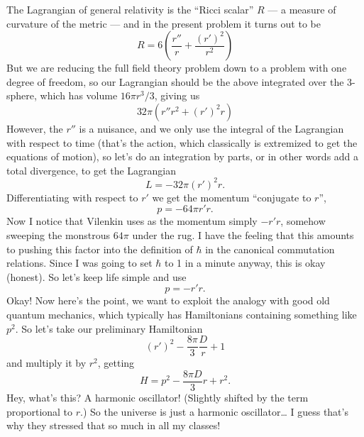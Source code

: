 \documentclass{article}
\begin{document}
The Lagrangian of general relativity is the ``Ricci scalar'' \(R\) --- a
measure of curvature of the metric --- and in the present problem it
turns out to be
\[R = 6 \left(\frac{r''}{r} + \frac{(r')^2}{r^2}\right)\] But we are
reducing the full field theory problem down to a problem with one degree
of freedom, so our Lagrangian should be the above integrated over the
3-sphere, which has volume \(16 \pi r^3/3\), giving us
\[32\pi (r''r^2 + (r')^2 r)\] However, the \(r''\) is a nuisance, and we
only use the integral of the Lagrangian with respect to time (that's the
action, which classically is extremized to get the equations of motion),
so let's do an integration by parts, or in other words add a total
divergence, to get the Lagrangian \[L = -32\pi (r')^2 r.\]
Differentiating with respect to \(r'\) we get the momentum ``conjugate
to \(r\)'', \[p = -64\pi r'r.\] Now I notice that Vilenkin uses as the
momentum simply \(-r'r\), somehow sweeping the monstrous \(64\pi\) under
the rug. I have the feeling that this amounts to pushing this factor
into the definition of \(\hbar\) in the canonical commutation relations.
Since I was going to set \(\hbar\) to 1 in a minute anyway, this is okay
(honest). So let's keep life simple and use \[p = -r'r.\] Okay! Now
here's the point, we want to exploit the analogy with good old quantum
mechanics, which typically has Hamiltonians containing something like
\(p^2\). So let's take our preliminary Hamiltonian
\[(r')^2-\frac{8\pi}{3} \frac{D}{r} + 1\] and multiply it by \(r^2\),
getting \[H = p^2-\frac{8\pi D}{3}r + r^2.\] Hey, what's this? A
harmonic oscillator! (Slightly shifted by the term proportional to
\(r\).) So the universe is just a harmonic oscillator\ldots{} I guess
that's why they stressed that so much in all my classes!
\end{document}

